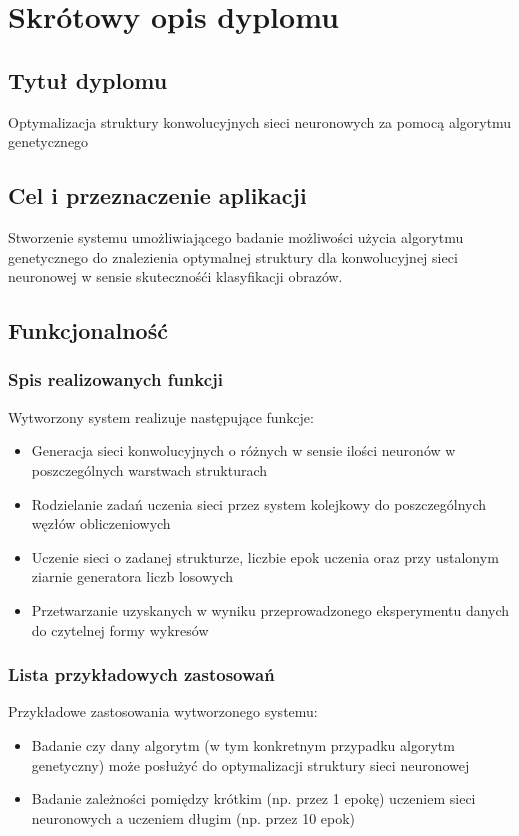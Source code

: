 \chapter[Dodatek A]{Skrótowy opis dyplomu}
\section{Tytuł dyplomu}
Optymalizacja struktury konwolucyjnych sieci neuronowych za
pomocą algorytmu genetycznego
\section{Cel i przeznaczenie aplikacji}
Stworzenie systemu umożliwiającego badanie możliwości użycia algorytmu genetycznego do znalezienia optymalnej struktury dla konwolucyjnej sieci neuronowej w sensie skutecznośći klasyfikacji obrazów.
\section{Funkcjonalność}

\subsection{Spis realizowanych funkcji}
Wytworzony system realizuje następujące funkcje:
\begin{itemize}
  \item Generacja sieci konwolucyjnych o różnych w sensie ilości neuronów w poszczególnych warstwach strukturach
  \item Rodzielanie zadań uczenia sieci przez system kolejkowy do poszczególnych węzłów obliczeniowych
  \item Uczenie sieci o zadanej strukturze, liczbie epok uczenia oraz przy ustalonym ziarnie generatora liczb losowych
  \item Przetwarzanie uzyskanych w wyniku przeprowadzonego eksperymentu danych do czytelnej formy wykresów
\end{itemize}
\subsection{Lista przykładowych zastosowań}
Przykładowe zastosowania wytworzonego systemu:
\begin{itemize}
  \item Badanie czy dany algorytm (w tym konkretnym przypadku algorytm genetyczny) może posłużyć do optymalizacji struktury sieci neuronowej
  \item Badanie zależności pomiędzy krótkim (np. przez 1 epokę) uczeniem sieci neuronowych a uczeniem długim (np. przez 10 epok)
\end{itemize}

